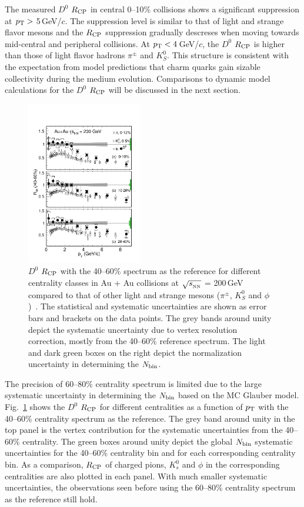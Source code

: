 \documentclass[%
 reprint,	
 amsmath,amssymb,
 aps,
 prc,
]{revtex4-1}
\begin{document}
The measured $D^0$ $R_{\rm CP}$ in central 0--10\% collisions shows a significant suppression at $p_{\rm T}>$ 5\,GeV/$c$. The suppression level is similar to that of light and strange flavor mesons and the $R_{\rm CP}$ suppression gradually descreses when moving towards mid-central and peripheral collisions. At $p_{\rm T}<4$\,GeV/$c$, the $D^0$ $R_{\rm CP}$ is higher than those of light flavor hadrons $\pi^{\pm}$ and $K_{S}^0$. This structure is consistent with the expectation from model predictions that charm quarks gain sizable collectivity during the medium evolution. Comparisons to dynamic model calculations for the $D^0$ $R_{\rm CP}$ will be discussed in the next section.

\begin{figure}
\centering
\includegraphics[width=0.45\textwidth]{fig/D0_Rcp2.pdf}
\caption{$D^{0}$ $R_{\rm CP}$ with the 40--60\% spectrum as the reference for different centrality classes in Au + Au collisions at $\sqrt{s_{_{\rm NN}}}$ = 200\,GeV compared to that of other light and strange mesons ($\pi^{\pm}$, $K^0_{S}$ and $\phi$)~\cite{Adams2006_Identified,Abelev2009,Agakishiev2012}. The statistical and systematic uncertainties are shown as error bars and brackets on the data points. The grey bands around unity depict the systematic uncertainty due to vertex resolution correction, mostly from the 40--60\% reference spectrum. The light and dark green boxes on the right depict the normalization uncertainty in determining the $N_{\rm bin}$.}
\label{fig:D0_Rcp2} 
\end{figure}

The precision of 60--80\% centrality spectrum is limited due to the large systematic uncertainty in determining the $N_{\rm bin}$ based on the MC Glauber model. Fig.~\ref{fig:D0_Rcp2} shows the $D^0$ $R_{\rm CP}$ for different centralities as a function of $p_{\rm T}$ with the 40--60\% centrality spectrum as the reference. The grey band around unity in the top panel is the vertex contribution for the systematic uncertainties from the 40--60\% centrality. The green boxes around unity depict the global $N_{\rm bin}$ systematic uncertainties for the 40--60\% centrality bin and for each corresponding centrality bin. As a comparison, $R_{\rm CP}$ of charged pions, $K_{s}^{0}$ and $\phi$ in the corresponding centralities are also plotted in each panel. With much smaller systematic uncertainties, the observations seen before using the 60--80\% centrality spectrum as the reference still hold. 
\end{document}
